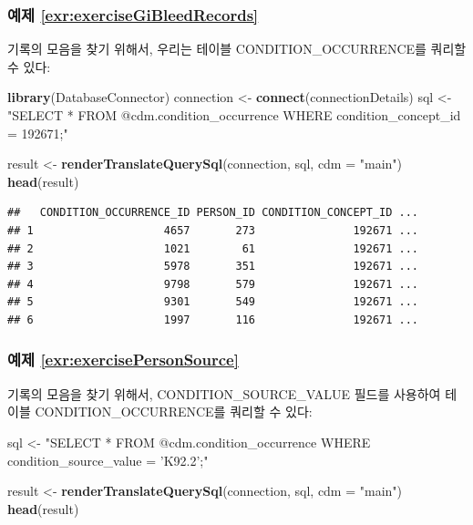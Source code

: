 \documentclass[10.5pt]{book}
\newenvironment{Shaded}{\begin{snugshade}}{\end{snugshade}}
\newcommand{\KeywordTok}[1]{\textcolor[rgb]{0.13,0.29,0.53}{\textbf{#1}}}
\newcommand{\DataTypeTok}[1]{\textcolor[rgb]{0.13,0.29,0.53}{#1}}
\newcommand{\StringTok}[1]{\textcolor[rgb]{0.31,0.60,0.02}{#1}}
\newcommand{\NormalTok}[1]{#1}
\theoremstyle{definition}
\theoremstyle{definition}
\theoremstyle{definition}
\theoremstyle{remark}
\begin{document}
\subsubsection*{예제
\ref{exr:exerciseGiBleedRecords}}\label{-refexrexercisegibleedrecords}

기록의 모음을 찾기 위해서, 우리는 테이블 CONDITION\_OCCURRENCE를 쿼리할
수 있다:

\begin{Shaded}
\begin{Highlighting}[]
\KeywordTok{library}\NormalTok{(DatabaseConnector)}
\NormalTok{connection <-}\StringTok{ }\KeywordTok{connect}\NormalTok{(connectionDetails)}
\NormalTok{sql <-}\StringTok{ "SELECT *}
\StringTok{FROM @cdm.condition_occurrence}
\StringTok{WHERE condition_concept_id = 192671;"}

\NormalTok{result <-}\StringTok{ }\KeywordTok{renderTranslateQuerySql}\NormalTok{(connection, sql, }\DataTypeTok{cdm =} \StringTok{"main"}\NormalTok{)}
\KeywordTok{head}\NormalTok{(result)}
\end{Highlighting}
\end{Shaded}

\begin{verbatim}
##   CONDITION_OCCURRENCE_ID PERSON_ID CONDITION_CONCEPT_ID ...
## 1                    4657       273               192671 ...
## 2                    1021        61               192671 ...
## 3                    5978       351               192671 ...
## 4                    9798       579               192671 ...
## 5                    9301       549               192671 ...
## 6                    1997       116               192671 ...
\end{verbatim}

\subsubsection*{예제
\ref{exr:exercisePersonSource}}\label{-refexrexercisepersonsource}

기록의 모음을 찾기 위해서, CONDITION\_SOURCE\_VALUE 필드를 사용하여
테이블 CONDITION\_OCCURRENCE를 쿼리할 수 있다:

\begin{Shaded}
\begin{Highlighting}[]
\NormalTok{sql <-}\StringTok{ "SELECT *}
\StringTok{FROM @cdm.condition_occurrence}
\StringTok{WHERE condition_source_value = 'K92.2';"}

\NormalTok{result <-}\StringTok{ }\KeywordTok{renderTranslateQuerySql}\NormalTok{(connection, sql, }\DataTypeTok{cdm =} \StringTok{"main"}\NormalTok{)}
\KeywordTok{head}\NormalTok{(result)}
\end{Highlighting}
\end{Shaded}
\end{document}
